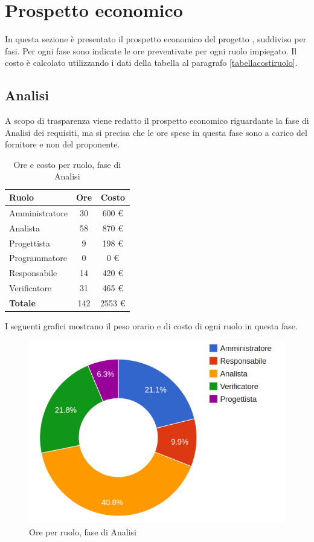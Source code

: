 \section{Prospetto economico}

In questa sezione è presentato il prospetto economico del progetto \ProjectName{}, suddiviso per fasi. Per ogni fase sono indicate le ore preventivate per ogni ruolo impiegato.
Il costo è calcolato utilizzando i dati della tabella al paragrafo \ref{tabellacostiruolo}.

\subsection{Analisi}

A scopo di trasparenza viene redatto il prospetto economico riguardante la fase di Analisi dei requisiti, ma si precisa che le ore spese in questa fase sono a carico del fornitore e non del proponente.

\begin{table}[H]
	\centering
	\begin{tabular}{ l c c }
	\textbf{Ruolo} & \textbf{Ore} & \textbf{Costo} \\
	\hline
	Amministratore & 30 & 600 €\\
	Analista & 58 & 870 €\\
	Progettista & 9 & 198 €\\
	Programmatore & 0 & 0 €\\
	Responsabile & 14 & 420 €\\
	Verificatore & 31 & 465 €\\
	\hline
	\textbf{Totale} & 142 & 2553 €\\
	\hline
	\end{tabular}
	\caption{Ore e costo per ruolo, fase di Analisi}
	\end{table}

I seguenti grafici mostrano il peso orario e di costo di ogni ruolo in questa fase.

\begin{figure}[H]
\centering
\includegraphics[scale=0.35]{5-1-1.png}
\caption{Ore per ruolo, fase di Analisi\label{fig:nome}}
\end{figure}


